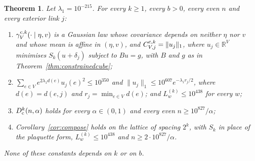 \documentclass[11pt]{amsart}
\newtheorem{theorem}{Theorem}[section]
\theoremstyle{definition}
\theoremstyle{remark}
\numberwithin{equation}{section}
\newcommand{\R}{\mathbb{R}}
\begin{document}
\begin{theorem}\label{thm:constrainedscales}
Let $\lambda_1=10^{-215}$. For every $k\ge1$, every $b>0$, every even $n$
and every exterior link $j$:
\begin{enumerate}[label=\textup{(\roman*)},leftmargin=*]
\item $\gamma^{{\rm c},k}_V(\cdot\mid\eta,v)$ is a Gaussian law whose
covariance depends on neither $\eta$ nor $v$ and whose mean is affine in
$(\eta,v)$, and $C^{{\rm c},k}_{V,j}=\|u_j\|_1$, where $u_j\in\R^V$
minimises $S_k(u+\delta_j)$ subject to $Bu=g$, with $B$ and $g$ as in
Theorem~\ref{thm:constrainedcube};
\item $\sum_{e\in V}e^{2\lambda_1d(e)}u_j(e)^2\le10^{350}$ and $\|u_j\|_1\le
10^{607}e^{-\lambda_1r_j/2}$, where $d(e)=d(e,j)$ and $r_j=\min_{e\in V}d(e)$;
and $L^{(k)}_w\le10^{438}$ for every $w$;
\item $D^k_{\rm c}(n,\alpha)$ holds for every $\alpha\in(0,1)$ and every even
$n\ge10^{827}/\alpha$;
\item Corollary~\ref{cor:compose} holds on the lattice of spacing $2^k$,
with $S_k$ in place of the plaquette form, $L^{(k)}_w\le10^{438}$ and
$n\ge2\cdot10^{827}/\alpha$.
\end{enumerate}
None of these constants depends on $k$ or on $b$.
\end{theorem}
\end{document}
